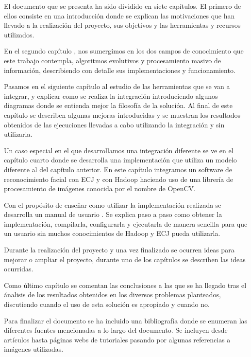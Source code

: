 El documento que se presenta ha sido dividido en siete cap\'itulos. El primero de ellos consiste en una introducci\'on  donde se explican las motivaciones que han llevado a la realizaci\'on del proyecto, sus objetivos y las herramientas y recursos utilizados.

En el segundo cap\'itulo , nos sumergimos en los dos campos de conocimiento que este trabajo contempla, algoritmos evolutivos y procesamiento masivo de informaci\'on, describiendo con detalle sus implementaciones y funcionamiento.

Pasamos en el siguiente cap\'itulo  al estudio de las herramientas que se van a integrar, y explicar como se realiza la integraci\'on introduciendo algunos diagramas donde se entienda mejor la filosofía de la solución. Al final de este cap\'itulo se describen algunas mejoras introducidas y se muestran los resultados obtenidos de las ejecuciones llevadas a cabo utilizando la integraci\'on y sin utilizarla.

Un caso especial en el que desarrollamos una integraci\'on diferente se ve en el cap\'itulo cuarto  donde se desarrolla una implementaci\'on que utiliza un modelo diferente al del cap\'itulo anterior. En este cap\'itulo integramos un software de reconocimiento facial con ECJ y con Hadoop haciendo uso de una librer\'ia de procesamiento de im\'agenes conocida por el nombre de OpenCV.

Con el prop\'osito de ense\~nar como utilizar la implementaci\'on realizada se desarrolla un manual de usuario . Se explica paso a paso como obtener la implementaci\'on, compilarla, configurarla y ejecutarla de manera sencilla para que un usuario sin muchos conocimientos de Hadoop y ECJ pueda utilizarla.

Durante la realizaci\'on del proyecto y una vez finalizado se ocurren ideas para mejorar o ampliar el proyecto,  durante uno de los cap\'itulos  se describen las ideas ocurridas.

Como \'ultimo cap\'itulo  se comentan las conclusiones a las que se ha llegado tras el \'analisis de los resultados obtenidos en los diversos problemas planteados, discutiendo cuando el uso de esta soluci\'on es apropiado y cuando no.

Para finalizar el documento se ha incluido una bibliografía donde se enumeran las diferentes fuentes mencionadas a lo largo del documento. Se incluyen desde art\'iculos hasta p\'aginas webs de tutoriales pasando por algunas referencias a im\'agenes utilizadas.